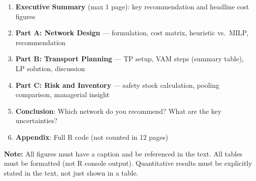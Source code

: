 \documentclass[
  a4paper,
]{article}
\providecommand{\tightlist}{%
  \setlength{\itemsep}{0pt}\setlength{\parskip}{0pt}}
\begin{document}
\begin{enumerate}
\def\labelenumi{\arabic{enumi}.}
\tightlist
\item
  \textbf{Executive Summary} (max 1 page): key recommendation and
  headline cost figures
\item
  \textbf{Part A: Network Design} --- formulation, cost matrix,
  heuristic vs.~MILP, recommendation
\item
  \textbf{Part B: Transport Planning} --- TP setup, VAM steps (summary
  table), LP solution, discussion
\item
  \textbf{Part C: Risk and Inventory} --- safety stock calculation,
  pooling comparison, managerial insight
\item
  \textbf{Conclusion}: Which network do you recommend? What are the key
  uncertainties?
\item
  \textbf{Appendix}: Full R code (not counted in 12 pages)
\end{enumerate}

\textbf{Note:} All figures must have a caption and be referenced in the
text. All tables must be formatted (not R console output). Quantitative
results must be explicitly stated in the text, not just shown in a
table.
\end{document}

